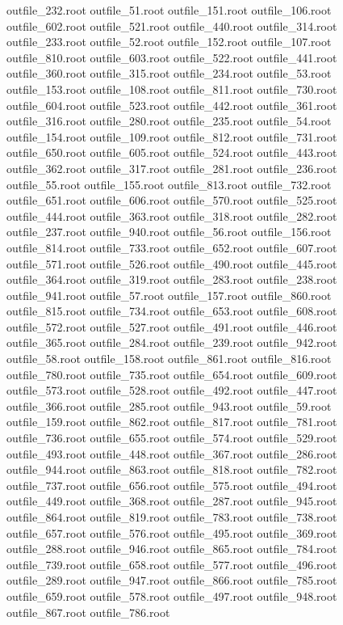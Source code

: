 outfile_232.root
outfile_51.root
outfile_151.root
outfile_106.root
outfile_602.root
outfile_521.root
outfile_440.root
outfile_314.root
outfile_233.root
outfile_52.root
outfile_152.root
outfile_107.root
outfile_810.root
outfile_603.root
outfile_522.root
outfile_441.root
outfile_360.root
outfile_315.root
outfile_234.root
outfile_53.root
outfile_153.root
outfile_108.root
outfile_811.root
outfile_730.root
outfile_604.root
outfile_523.root
outfile_442.root
outfile_361.root
outfile_316.root
outfile_280.root
outfile_235.root
outfile_54.root
outfile_154.root
outfile_109.root
outfile_812.root
outfile_731.root
outfile_650.root
outfile_605.root
outfile_524.root
outfile_443.root
outfile_362.root
outfile_317.root
outfile_281.root
outfile_236.root
outfile_55.root
outfile_155.root
outfile_813.root
outfile_732.root
outfile_651.root
outfile_606.root
outfile_570.root
outfile_525.root
outfile_444.root
outfile_363.root
outfile_318.root
outfile_282.root
outfile_237.root
outfile_940.root
outfile_56.root
outfile_156.root
outfile_814.root
outfile_733.root
outfile_652.root
outfile_607.root
outfile_571.root
outfile_526.root
outfile_490.root
outfile_445.root
outfile_364.root
outfile_319.root
outfile_283.root
outfile_238.root
outfile_941.root
outfile_57.root
outfile_157.root
outfile_860.root
outfile_815.root
outfile_734.root
outfile_653.root
outfile_608.root
outfile_572.root
outfile_527.root
outfile_491.root
outfile_446.root
outfile_365.root
outfile_284.root
outfile_239.root
outfile_942.root
outfile_58.root
outfile_158.root
outfile_861.root
outfile_816.root
outfile_780.root
outfile_735.root
outfile_654.root
outfile_609.root
outfile_573.root
outfile_528.root
outfile_492.root
outfile_447.root
outfile_366.root
outfile_285.root
outfile_943.root
outfile_59.root
outfile_159.root
outfile_862.root
outfile_817.root
outfile_781.root
outfile_736.root
outfile_655.root
outfile_574.root
outfile_529.root
outfile_493.root
outfile_448.root
outfile_367.root
outfile_286.root
outfile_944.root
outfile_863.root
outfile_818.root
outfile_782.root
outfile_737.root
outfile_656.root
outfile_575.root
outfile_494.root
outfile_449.root
outfile_368.root
outfile_287.root
outfile_945.root
outfile_864.root
outfile_819.root
outfile_783.root
outfile_738.root
outfile_657.root
outfile_576.root
outfile_495.root
outfile_369.root
outfile_288.root
outfile_946.root
outfile_865.root
outfile_784.root
outfile_739.root
outfile_658.root
outfile_577.root
outfile_496.root
outfile_289.root
outfile_947.root
outfile_866.root
outfile_785.root
outfile_659.root
outfile_578.root
outfile_497.root
outfile_948.root
outfile_867.root
outfile_786.root

